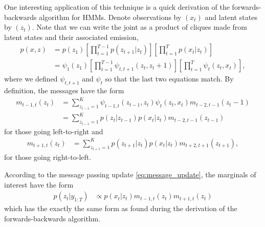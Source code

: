 \documentclass[14pt]{extreport}
\begin{document}
One interesting application of this technique is a quick derivation of the
forwards-backwards algorithm for HMMs. Denote observations by $\left(x_t\right)$
and latent states by $\left(z_t\right)$. Note that we can write the joint as a
product of cliques made from latent states and their associated emission,
\begin{align*}
  p\left(x, z\right) &= p\left(z_1\right) \left[\prod_{t = 1}^{T - 1} p\left(z_{t + 1} \vert z_t\right)\right]
  \left[\prod_{t = 1}^{T} p\left(x_t \vert z_t\right)\right] \\
    &= \psi_1\left(z_1\right) \left[\prod_{t = 1}^{T - 1} \psi_{t, t + 1}\left(z_t, z_t +
    1\right)\right] \left[\prod_{t = 1}^{T} \psi_t\left(z_t, x_t\right)\right],
\end{align*}
where we defined $\psi_{t, t + 1}$ and $\psi_t$ so that the last two equations
match. By definition, the messages have the form
\begin{align*}
  m_{t - 1, t}\left(z_{t}\right) &= \sum_{z_{t - 1} = 1}^{K} \psi_{t - 1, t}\left(z_{t - 1}, z_t\right) \psi_{t}\left(z_t, x_t\right) m_{t - 2, t - 1}\left(z_t - 1\right) \\
  &= \sum_{z_{t - 1} = 1}^{K} p\left(z_t \vert z_{t - 1}\right)p\left(x_t \vert z_t\right)m_{t - 2, t - 1}\left(z_{t - 1}\right)
\end{align*}
for those going left-to-right and
\begin{align*}
  m_{t + 1, t}\left(z_t\right) &= \sum_{z_{t + 1} = 1}^{K} p\left(z_{t + 1}\vert z_t\right)p\left(x_t \vert z_t\right)m_{t + 2, t + 1}\left(z_{t + 1}\right),
\end{align*}
for those going right-to-left.

According to the message passing update \ref{eq:message_update}, the marginals
of interest have the form
\begin{align*}
  p\left(z_{t} \vert y_{1:T}\right) &\propto p\left(x_t \vert z_t\right) m_{t - 1, t}\left(z_t\right)m_{t + 1, t}\left(z_t\right)
\end{align*}
which has the exactly the same form as found during the derivation of the
forwards-backwards algorithm.

\end{document}
